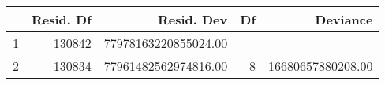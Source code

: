 \begin{table}[ht]
\centering
\begin{tabular}{lrrrr}
  \hline
 & Resid. Df & Resid. Dev & Df & Deviance \\ 
  \hline
1 & 130842 & 77978163220855024.00 &  &  \\ 
  2 & 130834 & 77961482562974816.00 & 8 & 16680657880208.00 \\ 
   \hline
\end{tabular}
\end{table}
